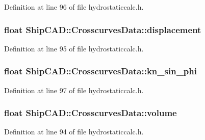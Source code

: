 Definition at line 96 of file hydrostaticcalc.\+h.

\subsubsection[{\texorpdfstring{displacement}{displacement}}]{\setlength{\rightskip}{0pt plus 5cm}float Ship\+C\+A\+D\+::\+Crosscurves\+Data\+::displacement}\hypertarget{structShipCAD_1_1CrosscurvesData_a9a7baa66159e203888390eaa63caf708}{}\label{structShipCAD_1_1CrosscurvesData_a9a7baa66159e203888390eaa63caf708}


Definition at line 95 of file hydrostaticcalc.\+h.

\subsubsection[{\texorpdfstring{kn\+\_\+sin\+\_\+phi}{kn_sin_phi}}]{\setlength{\rightskip}{0pt plus 5cm}float Ship\+C\+A\+D\+::\+Crosscurves\+Data\+::kn\+\_\+sin\+\_\+phi}\hypertarget{structShipCAD_1_1CrosscurvesData_a55150860fed821e314e18b72f1975749}{}\label{structShipCAD_1_1CrosscurvesData_a55150860fed821e314e18b72f1975749}


Definition at line 97 of file hydrostaticcalc.\+h.

\subsubsection[{\texorpdfstring{volume}{volume}}]{\setlength{\rightskip}{0pt plus 5cm}float Ship\+C\+A\+D\+::\+Crosscurves\+Data\+::volume}\hypertarget{structShipCAD_1_1CrosscurvesData_a9bec38a77bf87ab5feb76899e39e4f7b}{}\label{structShipCAD_1_1CrosscurvesData_a9bec38a77bf87ab5feb76899e39e4f7b}


Definition at line 94 of file hydrostaticcalc.\+h.

